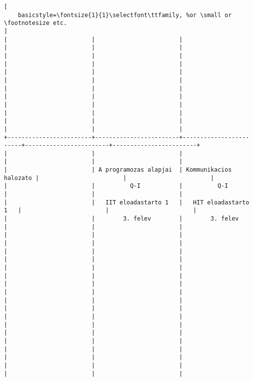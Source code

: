 \begin{lstlisting}[
    basicstyle=\fontsize{1}{1}\selectfont\ttfamily, %or \small or \footnotesize etc.
]
|                        |                        |                        |                        |                        | 
|                        |                        |                        |                        |                        | 
|                        |                        |                        |                        |                        | 
|                        |                        |                        |                        |                        | 
|                        |                        |                        |                        |                        | 
|                        |                        |                        |                        |                        | 
+------------------------+------------------------+------------------------+------------------------+------------------------+
|                        |                        |                        |                        |                        | 
|                        | A programozas alapjai  | Kommunikacios halozato |                        |                        | 
|                        |          Q-I           |          Q-I           |                        |                        | 
|                        |   IIT eloadastarto 1   |   HIT eloadastarto 1   |                        |                        | 
|                        |        3. felev        |        3. felev        |                        |                        | 
|                        |                        |                        |                        |                        | 
|                        |                        |                        |                        |                        | 
|                        |                        |                        |                        |                        | 
|                        |                        |                        |                        |                        | 
|                        |                        |                        |                        |                        | 
|                        |                        |                        |                        |                        | 
|                        |                        |                        |                        |                        | 
|                        |                        |                        |                        |                        | 
|                        |                        |                        |                        |                        | 

\end{lstlisting}
